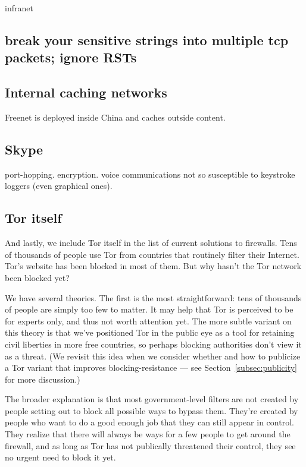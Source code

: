 \documentclass{llncs}
\begin{document}
infranet

\subsection{break your sensitive strings into multiple tcp packets;
ignore RSTs}

\subsection{Internal caching networks}

Freenet is deployed inside China and caches outside content.

\subsection{Skype}

port-hopping. encryption. voice communications not so susceptible to
keystroke loggers (even graphical ones).


\subsection{Tor itself}

And lastly, we include Tor itself in the list of current solutions
to firewalls. Tens of thousands of people use Tor from countries that
routinely filter their Internet. Tor's website has been blocked in most
of them. But why hasn't the Tor network been blocked yet?

We have several theories. The first is the most straightforward: tens of
thousands of people are simply too few to matter. It may help that Tor is
perceived to be for experts only, and thus not worth attention yet. The
more subtle variant on this theory is that we've positioned Tor in the
public eye as a tool for retaining civil liberties in more free countries,
so perhaps blocking authorities don't view it as a threat. (We revisit
this idea when we consider whether and how to publicize a Tor variant
that improves blocking-resistance --- see Section~\ref{subsec:publicity}
for more discussion.)

The broader explanation is that most government-level filters are not
created by people setting out to block all possible ways to bypass
them. They're created by people who want to do a good enough job that
they can still appear in control. They realize that there will always
be ways for a few people to get around the firewall, and as long as Tor
has not publically threatened their control, they see no urgent need to
block it yet.
\end{document}
